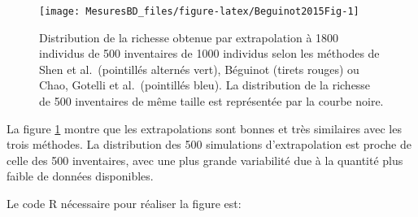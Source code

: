 \documentclass[
  11pt,
  french,
  a4paper,
  extrafontsizes,onecolumn,openright
  ]{memoir}
\begin{document}
\scriptsize

\begin{figure}

{\centering \texttt{[image: MesuresBD\_files/figure-latex/Beguinot2015Fig-1]} 

}

\caption{Distribution de la richesse obtenue par extrapolation à 1800 individus de 500 inventaires de 1000 individus selon les méthodes de Shen et al.~(pointillés alternés vert), Béguinot (tirets rouges) ou Chao, Gotelli et al.~(pointillés bleu). La distribution de la richesse de 500 inventaires de même taille est représentée par la courbe noire.}\label{fig:Beguinot2015Fig}
\end{figure}

\normalsize

La figure \ref{fig:Beguinot2015Fig} montre que les extrapolations sont bonnes et très similaires avec les trois méthodes.
La distribution des 500 simulations d'extrapolation est proche de celle des 500 inventaires, avec une plus grande variabilité due à la quantité plus faible de données disponibles.

Le code R nécessaire pour réaliser la figure est:

\scriptsize
\end{document}

